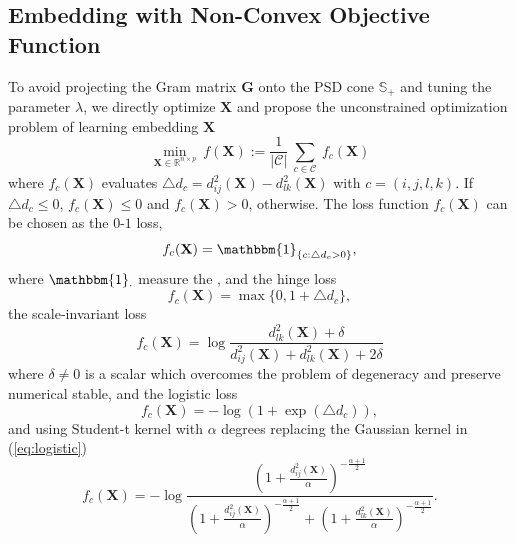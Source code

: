 \documentclass[letterpaper]{article}
\begin{document}
		\subsection{Embedding with Non-Convex Objective Function}
		To avoid projecting the Gram matrix $\mathbf{G}$ onto the PSD cone $\mathbb{S}_{+}$ and tuning the parameter $\lambda$, we directly optimize $\mathbf{X}$ and propose the unconstrained optimization problem of learning embedding $\mathbf{X}$
		\begin{equation}
			\label{eq:2}
			\underset{\mathbf{X}\in\mathbb{R}^{n \times p}}{\min}\ f(\mathbf{X}):=\frac{1}{|\mathcal{C}|}\ \underset{c\in\mathcal{C}}{\sum}\ f_c(\mathbf{X})
		\end{equation}
		where $f_c(\mathbf{X})$ evaluates $\triangle d_c = d^2_{ij}(\mathbf{X})-d^2_{lk}(\mathbf{X})$ with $c=(i,j,l,k)$. If $\triangle d_c\leq 0$, $f_c(\mathbf{X})\leq 0$ and $f_c(\mathbf{X})>0$, otherwise. The loss function $f_c(\mathbf{X})$ can be chosen as the $0$-$1$ loss,
		\begin{equation}
			\label{eq:0-1}
			f_c(\mathbf{X}) = \mathbbm{1}_{\{c:\triangle d_c > 0\}},
		\end{equation}
		where $\mathbbm{1}_{\cdot}$ measure the , and the hinge loss \cite{agarwal2007generalized}
		\begin{equation}
			\label{eq:hinge}
			f_c(\mathbf{X}) = \max\{0, 1+\triangle d_c\},
		\end{equation}
		the scale-invariant loss \cite{tamuz2011adaptiive}
		\begin{equation}
			\label{eq:scale-invariant}
			f_c(\mathbf{X}) = \log\frac{d^2_{lk}(\mathbf{X})+\delta}{d^2_{ij}(\mathbf{X})+d^2_{lk}(\mathbf{X})+2\delta}
		\end{equation}
		where $\delta\neq 0$ is a scalar which overcomes the problem of degeneracy and preserve numerical stable, and the logistic loss \cite{vandermaaten2012stochastic}
		\begin{equation}
			\label{eq:logistic}
			f_c(\mathbf{X}) = -\log(1+\exp(\triangle d_c)),
		\end{equation}
		and using Student-t kernel with $\alpha$ degrees replacing the Gaussian kernel in (\ref{eq:logistic}) \cite{vandermaaten2012stochastic}
		\begin{equation}
			\label{eq:student}
			f_c(\mathbf{X}) = -\log\frac{\left(1+\frac{d^2_{ij}(\mathbf{X})}{\alpha}\right)^{-\frac{\alpha+1}{2}}}{\left(1+\frac{d^2_{ij}(\mathbf{X})}{\alpha}\right)^{-\frac{\alpha+1}{2}}+\left(1+\frac{d^2_{lk}(\mathbf{X})}{\alpha}\right)^{-\frac{\alpha+1}{2}}}.
		\end{equation}
\end{document}
